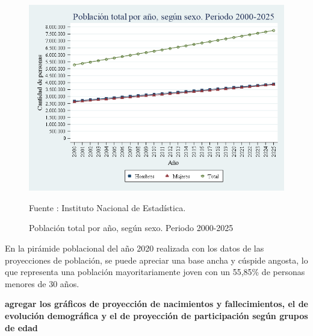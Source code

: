 \begin{figure}[H]
\begin{center}
                    \caption{Población total por año, según sexo. Periodo 2000-2025}
                    \includegraphics[scale=0.45]{indicadoresINE_pob_sexo_serie.png}
                                    \item \footnotesize Fuente : Instituto Nacional de Estadística.
                    \end{center}
\end{figure}

En la pirámide poblacional del año 2020 realizada con los datos de las
proyecciones de población, se puede apreciar una base ancha y cúspide
angosta, lo que representa una población mayoritariamente joven con un
55,85\% de personas menores de 30 años.

\textbf{agregar los gráficos de proyección de nacimientos y fallecimientos, el de evolución demográfica y el de proyección de participación según grupos de edad}


